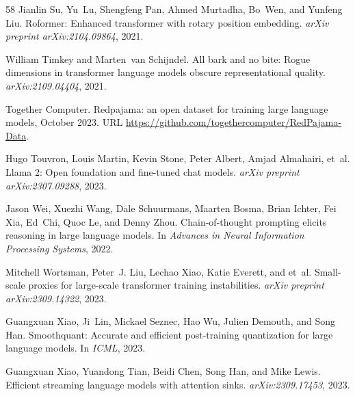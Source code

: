 \documentclass[10pt]{article}
\theoremstyle{definition}
\theoremstyle{plain}
\begin{document}
\begin{thebibliography}{58}
Jianlin Su, Yu~Lu, Shengfeng Pan, Ahmed Murtadha, Bo~Wen, and Yunfeng Liu.
\newblock Roformer: Enhanced transformer with rotary position embedding.
\newblock \emph{arXiv preprint arXiv:2104.09864}, 2021.

William Timkey and Marten~van Schijndel.
\newblock All bark and no bite: Rogue dimensions in transformer language models obscure representational quality.
\newblock \emph{arXiv:2109.04404}, 2021.

{Together Computer}.
\newblock Redpajama: an open dataset for training large language models, October 2023.
\newblock URL \url{https://github.com/togethercomputer/RedPajama-Data}.

Hugo Touvron, Louis Martin, Kevin Stone, Peter Albert, Amjad Almahairi, et~al.
\newblock Llama 2: Open foundation and fine-tuned chat models.
\newblock \emph{arXiv preprint arXiv:2307.09288}, 2023.

Jason Wei, Xuezhi Wang, Dale Schuurmans, Maarten Bosma, Brian Ichter, Fei Xia, Ed~Chi, Quoc Le, and Denny Zhou.
\newblock Chain-of-thought prompting elicits reasoning in large language models.
\newblock In \emph{Advances in Neural Information Processing Systems}, 2022.

Mitchell Wortsman, Peter~J. Liu, Lechao Xiao, Katie Everett, and et~al.
\newblock Small-scale proxies for large-scale transformer training instabilities.
\newblock \emph{arXiv preprint arXiv:2309.14322}, 2023.

Guangxuan Xiao, Ji~Lin, Mickael Seznec, Hao Wu, Julien Demouth, and Song Han.
\newblock Smoothquant: Accurate and efficient post-training quantization for large language models.
\newblock In \emph{ICML}, 2023{}.

Guangxuan Xiao, Yuandong Tian, Beidi Chen, Song Han, and Mike Lewis.
\newblock Efficient streaming language models with attention sinks.
\newblock \emph{arXiv:2309.17453}, 2023{}.


\end{thebibliography}
\end{document}
